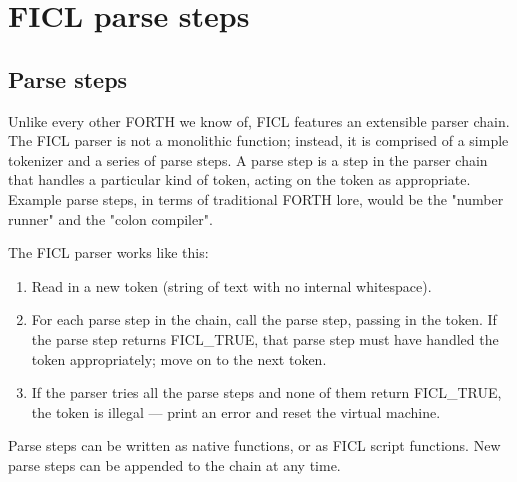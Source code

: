 \chapter{FICL parse steps}
\section{Parse steps}
Unlike every other FORTH we know of, FICL features an extensible parser
chain. The FICL parser is not a monolithic function; instead, it is
comprised of a simple tokenizer and a series of parse steps. A parse
step is a step in the parser chain that handles a particular kind of
token, acting on the token as appropriate. Example parse steps, in terms
of traditional FORTH lore, would be the "number runner" and the "colon
compiler".

The FICL parser works like this:
\begin{enumerate}[noitemsep]
	\item Read in a new token (string of text with no internal
	whitespace).

	\item For each parse step in the chain, call the parse step,
	passing in the token. If the parse step returns FICL\_TRUE, that
	parse step must have handled the token appropriately; move on to
	the next token.

	\item If the parser tries all the parse steps and none of them
	return FICL\_TRUE, the token is illegal — print an error and
	reset the virtual machine.
\end{enumerate}
Parse steps can be written as native functions, or as FICL script
functions. New parse steps can be appended to the chain at any time.


